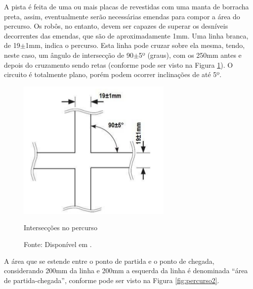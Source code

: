 A pista é feita de uma ou mais placas de  revestidas com uma manta de 
borracha preta, assim, eventualmente serão necessárias emendas para compor a área do percurso. Os robôs, no entanto, 
devem ser capazes de superar os desníveis decorrentes das emendas, que são de aproximadamente 1mm.
Uma linha branca, de 19$\pm$1mm, indica o percurso. Esta linha pode cruzar sobre ela mesma, tendo, neste caso, 
um ângulo de intersecção de 90$\pm$5º (graus), com os 250mm antes e depois do cruzamento sendo retas (conforme pode 
ser visto na Figura \ref{fig:percurso1}). O circuito é totalmente plano, porém podem ocorrer 
inclinações de até 5º.\par



\begin{figure}[h!]
 \centering
 \captionsetup{width=0.37\textwidth,font=footnotesize,textfont=bf}
 \includegraphics[scale=0.6]{figuras/Percurso1.png}
 \caption{Intersecções no percurso \label{fig:percurso1}}
 \vspace{-0.7cm}
 \caption*{Fonte: Disponível em \cite[p.4]{RegrasRobocore}.}
\end{figure}






A área que se estende entre o ponto de partida e o ponto de chegada, considerando 200mm da linha e 200mm a esquerda da linha
 é denominada ``área de partida-chegada'', conforme pode ser visto na Figura \ref{fig:percurso2}.\par

